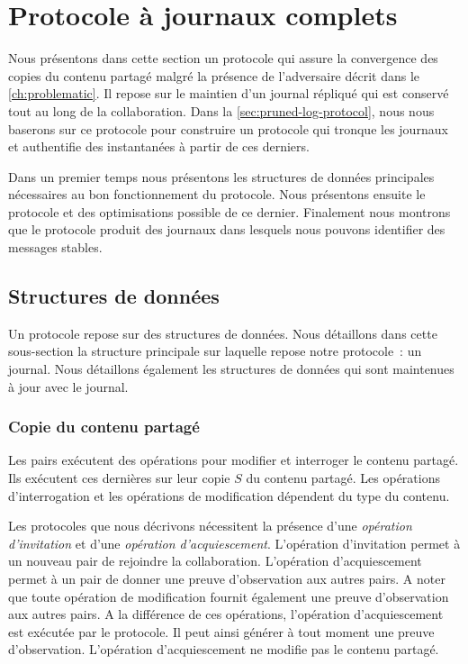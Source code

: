 \section{Protocole à journaux complets}\label{sec:full-log-protocol}

Nous présentons dans cette section un protocole qui assure la convergence des copies du contenu partagé malgré la présence de l'adversaire décrit dans le \autoref{ch:problematic}.
Il repose sur le maintien d'un journal répliqué qui est conservé tout au long de la collaboration.
Dans la \autoref{sec:pruned-log-protocol}, nous nous baserons sur ce protocole pour construire un protocole qui tronque les journaux et authentifie des instantanées à partir de ces derniers.

Dans un premier temps nous présentons les structures de données principales nécessaires au bon fonctionnement du protocole.
Nous présentons ensuite le protocole et des optimisations possible de ce dernier.
Finalement nous montrons que le protocole produit des journaux dans lesquels nous pouvons identifier des messages stables.


\subsection{Structures de données}

Un protocole repose sur des structures de données.
Nous détaillons dans cette sous-section la structure principale sur laquelle repose notre protocole~: un journal.
Nous détaillons également les structures de données qui sont maintenues à jour avec le journal.

\subsubsection{Copie du contenu partagé}

Les pairs exécutent des opérations pour modifier et interroger le contenu partagé.
Ils exécutent ces dernières sur leur copie $S$ du contenu partagé.
Les opérations d'interrogation et les opérations de modification dépendent du type du contenu.

Les protocoles que nous décrivons nécessitent la présence d'une \emph{opération d'invitation} et d'une \emph{opération d'acquiescement}.
L'opération d'invitation permet à un nouveau pair de rejoindre la collaboration.
L'opération d'acquiescement permet à un pair de donner une preuve d'observation aux autres pairs.
A noter que toute opération de modification fournit également une preuve d'observation aux autres pairs.
A la différence de ces opérations, l'opération d'acquiescement est exécutée par le protocole.
Il peut ainsi générer à tout moment une preuve d'observation.
L'opération d'acquiescement ne modifie pas le contenu partagé.

